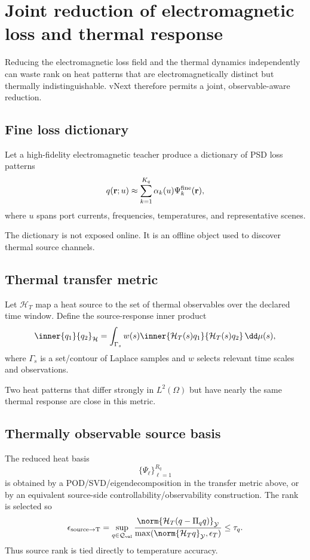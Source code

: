 \section{Joint reduction of electromagnetic loss and thermal response}
\label{sec:joint-loss-thermal}

Reducing the electromagnetic loss field and the thermal dynamics independently
can waste rank on heat patterns that are electromagnetically distinct but
thermally indistinguishable. vNext therefore permits a joint,
observable-aware reduction.

\subsection{Fine loss dictionary}

Let a high-fidelity electromagnetic teacher produce a dictionary of PSD loss
patterns
\[
  q(\mathbf r;u)
  \approx
  \sum_{k=1}^{K_q}\alpha_k(u)\Psi_k^{\rm fine}(\mathbf r),
\]
where $u$ spans port currents, frequencies, temperatures, and representative
scenes.

The dictionary is not exposed online. It is an offline object used to discover
thermal source channels.

\subsection{Thermal transfer metric}

Let $\mathcal H_T$ map a heat source to the set of thermal observables over the
declared time window. Define the source-response inner product
\[
 \inner{q_1}{q_2}_{\mathcal H}
 =
 \int_{\Gamma_s}
 w(s)
 \inner{\mathcal H_T(s)q_1}
        {\mathcal H_T(s)q_2}\,\dd\mu(s),
\]
where $\Gamma_s$ is a set/contour of Laplace samples and $w$ selects relevant
time scales and observations.

Two heat patterns that differ strongly in $L^2(\Omega)$ but have nearly the same
thermal response are close in this metric.

\subsection{Thermally observable source basis}

The reduced heat basis
\[
 \{\Psi_\ell\}_{\ell=1}^{R_q}
\]
is obtained by a POD/SVD/eigendecomposition in the transfer metric above, or by
an equivalent source-side controllability/observability construction. The rank
is selected so
\[
 \epsilon_{\rm source\to T}
 =
 \sup_{q\in\mathcal Q_{\rm val}}
 \frac{
  \norm{\mathcal H_T(q-\Pi_q q)}_{\mathcal Y}
 }{
  \max(\norm{\mathcal H_Tq}_{\mathcal Y},\epsilon_T)
 }
 \le \tau_q .
\]
Thus source rank is tied directly to temperature accuracy.

